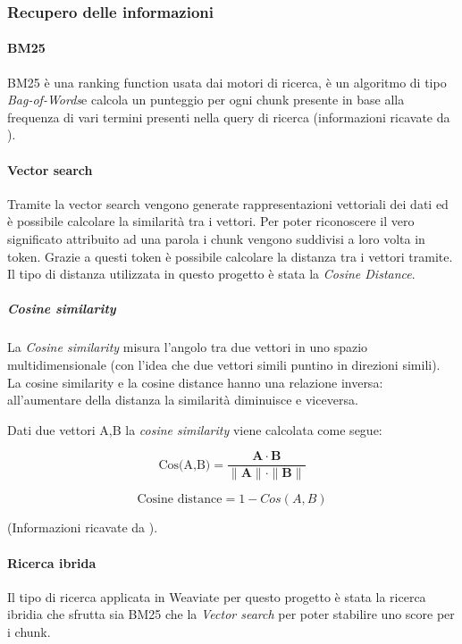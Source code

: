 \subsubsection{Recupero delle informazioni}
\label{subsubsec:rec-inf}
\paragraph{\gls{BM25}}
BM25 è una ranking function usata dai motori di ricerca, è un algoritmo di tipo \emph{\gls{Bag-of-Words}}\glsfirstoccur e calcola un punteggio per ogni chunk
presente in base alla frequenza di vari termini presenti nella query di ricerca (informazioni ricavate da \cite{site:wikiOkapi}). 

\paragraph{Vector search}
Tramite la vector search vengono generate rappresentazioni vettoriali dei dati ed è possibile calcolare la similarità tra i vettori.
Per poter riconoscere il vero significato attribuito ad una parola i chunk vengono suddivisi a loro volta in token.
Grazie a questi token è possibile calcolare la distanza tra i vettori tramite.
Il tipo di distanza utilizzata in questo progetto è stata la \emph{Cosine Distance}.

\subparagraph{Cosine similarity}
La \emph{Cosine similarity} misura l'angolo tra due vettori in uno spazio multidimensionale (con l'idea che due vettori simili puntino in direzioni simili).
La cosine similarity e la cosine distance hanno una relazione inversa: all'aumentare della distanza la similarità diminuisce e viceversa.

\noindent Dati due vettori A,B la \emph{cosine similarity} viene calcolata come segue:

\[
\text{Cos(A,B)} = \frac{{\mathbf{A} \cdot \mathbf{B}}}{{\|\mathbf{A}\| \cdot \|\mathbf{B}\|}}    
\]

\[
\text{Cosine distance} = 1-Cos(A,B)
\]

\noindent (Informazioni ricavate da \cite{site:weaviate-distance-metrics}).

\paragraph{Ricerca ibrida}
Il tipo di ricerca applicata in Weaviate per questo progetto è stata la ricerca ibridia che sfrutta sia BM25 che la \emph{Vector search} per poter stabilire uno score per i chunk.

